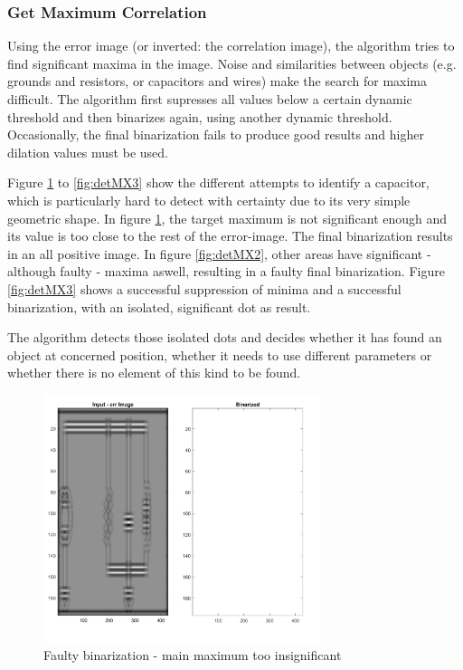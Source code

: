 \documentclass[10pt,twocolumn,letterpaper]{article}
\begin{document}
\subsubsection*{Get Maximum Correlation}

Using the error image (or inverted: the correlation image), the algorithm tries to find significant maxima in the image. Noise and similarities between objects (e.g. grounds and resistors, or capacitors and wires) make the search for maxima difficult. The algorithm first supresses all values below a certain dynamic threshold and then binarizes again, using another dynamic threshold. Occasionally, the final binarization fails to produce good results and higher dilation values must be used. 
\par
Figure \ref{fig:detMX1} to \ref{fig:detMX3} show the different attempts to identify a capacitor, which is particularly hard to detect with certainty due to its very simple geometric shape. In figure \ref{fig:detMX1}, the target maximum is not significant enough and its value is too close to the rest of the error-image. The final binarization results in an all positive image. In figure \ref{fig:detMX2}, other areas have significant - although faulty - maxima aswell, resulting in a faulty final binarization. Figure \ref{fig:detMX3} shows a successful suppression of minima and a successful binarization, with an isolated, significant dot as result. 
\par
The algorithm detects those isolated dots and decides whether it has found an object at concerned position, whether it needs to use different parameters or whether there is no element of this kind to be found.
\par

\begin{figure}[!ht]
\includegraphics[width = 3.2in]{img/detMX1.png}
\caption{Faulty binarization - main maximum too insignificant}
\label{fig:detMX1}
\end{figure}
\par
\end{document}
